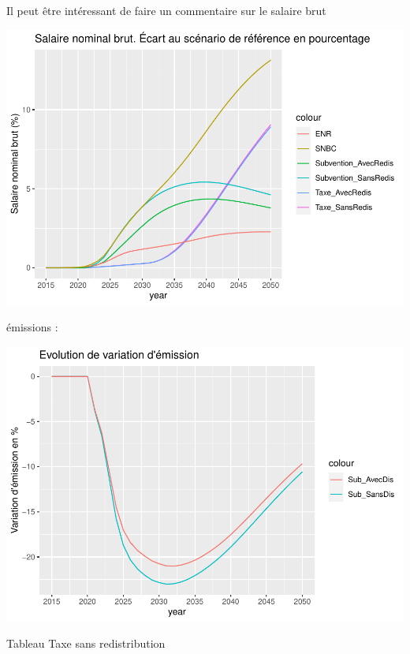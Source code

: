 \documentclass[
]{article}
\begin{document}
Il peut être intéressant de faire un commentaire sur le salaire brut

\begin{center}\includegraphics[width=0.7\linewidth,height=0.7\textheight]{Modele-ThreeMe-Tunisie_Sequeira_Valilou_Wang_files/figure-latex/unnamed-chunk-13-1} \end{center}

émissions :

\begin{center}\includegraphics[width=0.7\linewidth,height=0.7\textheight]{Modele-ThreeMe-Tunisie_Sequeira_Valilou_Wang_files/figure-latex/unnamed-chunk-14-1} \end{center}

Tableau Taxe sans redistribution
\end{document}
